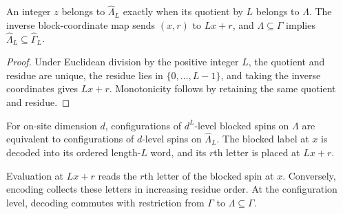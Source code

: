 \begin{lemma}
    \label{thm:qca_expanded_region_coordinates}
    \leanok
    An integer $z$ belongs to $\widehat\Lambda_L$ exactly when its quotient by
    $L$ belongs to $\Lambda$.  The inverse block-coordinate map sends $(x,r)$
    to $Lx+r$, and $\Lambda\subseteq\Gamma$ implies
    $\widehat\Lambda_L\subseteq\widehat\Gamma_L$.
\end{lemma}

\begin{proof}\leanok
    Under Euclidean division by the positive integer $L$, the quotient and
    residue are unique, the residue lies in $\{0,\ldots,L-1\}$, and taking the
    inverse coordinates gives $Lx+r$.  Monotonicity follows by retaining the
    same quotient and residue.
\end{proof}

\begin{definition}
    \label{def:qca_configuration_blocking}
    \leanok
    For on-site dimension $d$, configurations of $d^L$-level blocked spins on
    $\Lambda$ are equivalent to configurations of $d$-level spins on
    $\widehat\Lambda_L$.  The blocked label at $x$ is decoded into its ordered
    length-$L$ word, and its $r$th letter is placed at $Lx+r$.
\end{definition}

\begin{lemma}
    \label{thm:qca_configuration_blocking_formulas}
    \leanok
    Evaluation at $Lx+r$ reads the $r$th letter of the blocked spin at $x$.
    Conversely, encoding collects these letters in increasing residue order.
    At the configuration level, decoding commutes with restriction from
    $\Gamma$ to $\Lambda\subseteq\Gamma$.
\end{lemma}

